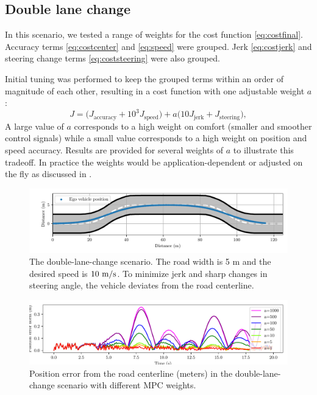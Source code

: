 \documentclass[letterpaper, 10 pt, conference]{ieeeconf}  %
\begin{document}
 \subsection{Double lane change}
 
In this scenario, we tested a range of weights for the cost function \eqref{eq:costfinal}. Accuracy terms \eqref{eq:costcenter} and \eqref{eq:speed} were grouped. Jerk \eqref{eq:costjerk} and steering change terms \eqref{eq:coststeering} were also grouped.
 
 Initial tuning was performed to keep the grouped terms within an order of magnitude of each other, resulting in a cost function with one adjustable weight $a$:
 $$J = \Big( J_{\text{accuracy}} + 10^3J_{\text{speed}} \Big) + a\Big( 10J_\text{{jerk}} + J_{\text{steering}}\Big),$$
 A large value of $a$ corresponds to a high weight on comfort (smaller and smoother control signals) while a small value corresponds to a high weight on position and speed accuracy.
 Results are provided for several weights of $a$ to illustrate this tradeoff.
 In practice the weights would be application-dependent or adjusted on the fly as discussed in \cite{nmpc_micheli}.
 
 
 \begin{figure}[h]
 	\centering
 	\includegraphics[width=1.0\linewidth]{figures/double_lane_change.pdf}
 	\caption{The double-lane-change scenario. The road width is 5 m and the desired speed is $10\ \text{m}/\text{s}$. To minimize jerk and sharp changes in steering angle, the vehicle deviates from the road centerline.}
 	\label{fig:trajectory(lanechange)}
 \end{figure}
 
 
 \begin{figure}[h]
 	\centering
 	\includegraphics[width=1.0\linewidth]{figures/Position_error(lanechange).pdf}
 	\caption{Position error from the road centerline (meters) in the double-lane-change scenario with different MPC weights.}
 	\label{fig:error(lanechange)}
 \end{figure}
 
\end{document}
